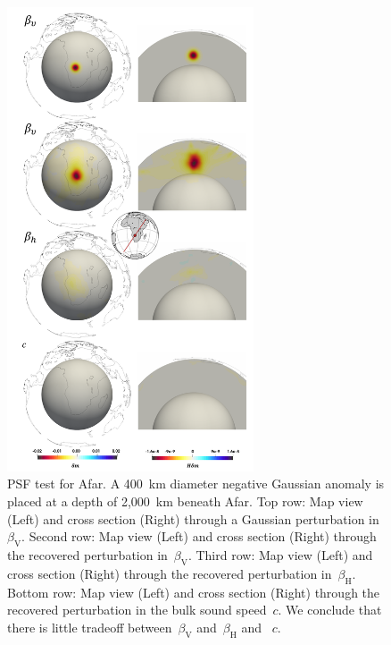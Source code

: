 \documentclass[extra,mreferee]{gji}
\begin{document}
\begin{figure}
  \centering
  \includegraphics[width=0.65\textwidth]{figures/psf/afar.pdf}
  \caption{\small{PSF test for Afar.
    A 400~km diameter negative Gaussian anomaly is placed at a depth of 2,000~km beneath Afar.
  Top row: Map view (Left) and cross section (Right) through a Gaussian perturbation in~$\beta_\mathrm{V}$.
  Second row: Map view (Left) and cross section (Right) through the recovered perturbation in~$\beta_\mathrm{V}$.
  Third row: Map view (Left) and cross section (Right) through the recovered perturbation in~$\beta_\mathrm{H}$.
  Bottom row: Map view (Left) and cross section (Right) through the recovered perturbation in the bulk sound speed~$c$. We conclude that there is little tradeoff between~$\beta_\mathrm{V}$ and~$\beta_\mathrm{H}$ and ~$c$.
  }}
  \label{fig:psf_afar}
\end{figure}
\end{document}
